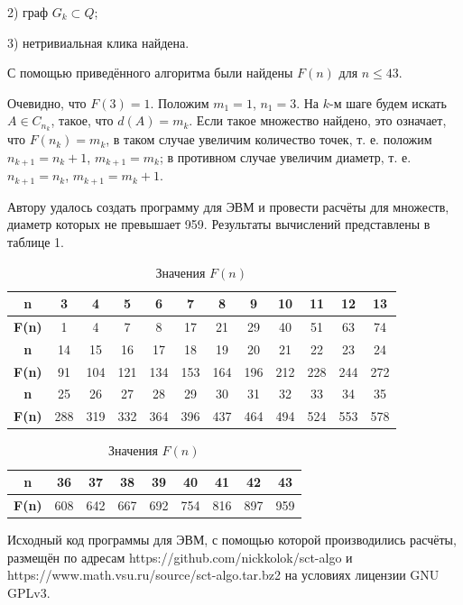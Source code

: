 \documentclass{article}
\begin{document}
2) граф $G_k \subset Q$;

3) нетривиальная клика найдена.



С помощью приведённого алгоритма были найдены $F(n)$ для $n \leq 43 $.

Очевидно, что $F(3) = 1$.
Положим $m_1=1$, $n_1=3$.
На $k$-м шаге будем искать $A \in C_{n_k}$, такое, что $d(A) = m_k$.
Если такое множество найдено, это означает, что $F(n_k)=m_k$,
в таком случае увеличим количество точек, т. е. положим $n_{k+1} = n_k +1$, $m_{k+1} = m_k$;
в противном случае увеличим диаметр, т. е. $n_{k+1} = n_k$, $m_{k+1} = m_k +1$.



Автору удалось создать программу для ЭВМ и провести расчёты для множеств, диаметр которых не превышает 959.
Результаты вычислений представлены в таблице 1.


\begin{table}[H]
\caption{Значения $F(n)$}
\label{tabular:pc_counted}
\begin{center}
\begin{tabular}{|c|c|c|c|c|c|c|c|c|c|c|c|}
\hline
\textbf{n}    &  3 & 4 & 5 & 6 &  7 &  8 &  9 & 10 & 11 & 12 & 13 \\
\hline
\textbf{F(n)} &  1 & 4 & 7 & 8 & 17 & 21 & 29 & 40 & 51 & 63 & 74  \\
\hline
\hline
\textbf{n}    &  14 &  15 &  16 &  17 &  18 &  19 &  20 &  21 &  22 &  23 &  24 \\
\hline
\textbf{F(n)} &  91 & 104 & 121 & 134 & 153 & 164 & 196 & 212 & 228 & 244 & 272  \\
\hline
\hline
\textbf{n}    &  25 &  26 &  27 &  28 &  29 &  30 &  31 &  32 &  33 &  34 &  35 \\
\hline
\textbf{F(n)} & 288 & 319 & 332 & 364 & 396 & 437 & 464 & 494 & 524 & 553 & 578  \\
\hline
\end{tabular}
\begin{tabular}{|c|c|c|c|c|c|c|c|c|}
\hline
\textbf{n}    &  36 &  37 &  38 &  39 &  40 &  41 &  42 &  43 \\
\hline
\textbf{F(n)} & 608 & 642 & 667 & 692 & 754 & 816 & 897 & 959 \\
\hline
\end{tabular}
\end{center}
\end{table}


Исходный код программы для ЭВМ, с помощью которой производились расчёты, размещён по адресам https://github.com/nickkolok/sct-algo и https://www.math.vsu.ru/source/sct-algo.tar.bz2 на условиях лицензии GNU GPLv3.
\end{document}
